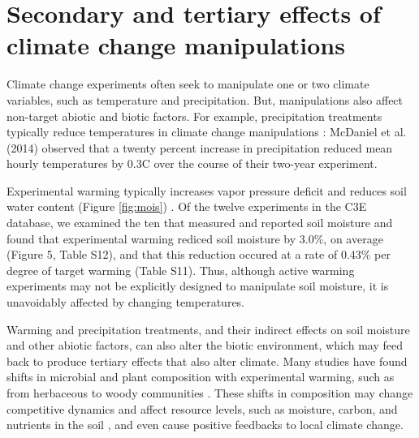 \documentclass{article}
\begin{document}
\section* {Secondary and tertiary effects of climate change manipulations} 
Climate change experiments often seek to manipulate one or two climate variables, such as temperature and precipitation. But, manipulations also affect non-target abiotic and biotic factors. For example, precipitation treatments typically reduce temperatures in climate change manipulations \citep{sherry2007,rollinson2012,mcdaniel2014}: McDaniel et al. (2014) observed that a twenty percent increase in precipitation reduced mean hourly temperatures by 0.3\degree C over the course of their two-year experiment.

\par Experimental warming typically increases vapor pressure deficit and reduces soil water content (Figure \ref{fig:mois}) \citep[e.g.,][]{sherry2007,morin2010,pelini2014,templer2016}. Of the twelve experiments in the C3E database, we examined the ten that measured and reported soil moisture and found that experimental warming rediced soil moisture by 3.0\%, on average (Figure 5, Table S12), and that this reduction occured at a rate of 0.43\% per degree of target warming (Table S11). Thus, although active warming experiments may not be explicitly designed to manipulate soil moisture, it is unavoidably affected by changing temperatures. 


\par Warming and precipitation treatments, and their indirect effects on soil moisture and other abiotic factors, can also alter the biotic environment, which may feed back to produce tertiary effects that also alter climate. Many studies have found shifts in microbial and plant composition with experimental warming, such as from herbaceous to woody communities \citep{rollinson2012, mcdaniel2014,mcdaniel2014b, harte2015}. These shifts in composition may change competitive dynamics and affect resource levels, such as moisture, carbon, and nutrients in the soil \citep{mcdaniel2014,mcdaniel2014b, harte2015}, and even cause positive feedbacks to local climate change\citep{harte2015}. 

\end{document}
